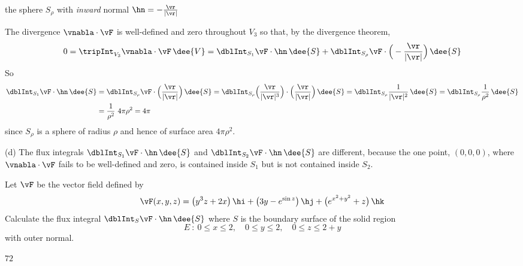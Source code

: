 \begin{solution}
\begin{itemize}
the sphere $S_\rho$ with \emph{inward} normal $\hn=-\frac{\vr}{|\vr|}$
\end{itemize}
The divergence $\vnabla\cdot\vF$ is well-defined and zero throughout $V_3$ 
so that, by the divergence theorem,
\begin{align*}
0=\tripInt_{V_3} \vnabla\cdot\vF\,\dee{V}
=\dblInt_{S_1} \vF\cdot\hn\,\dee{S} 
 +\dblInt_{S_\rho} \vF\cdot\Big(-\frac{\vr}{|\vr|}\Big)\,\dee{S}
\end{align*}
So
\begin{align*}
\dblInt_{S_1} \vF\cdot\hn\,\dee{S}
&=\dblInt_{S_\rho} \vF\cdot\Big(\frac{\vr}{|\vr|}\Big)\,\dee{S}
=\dblInt_{S_\rho} \Big(\frac{\vr}{|\vr|^3}\Big)\cdot\Big(\frac{\vr}{|\vr|}\Big)\,\dee{S}
=\dblInt_{S_\rho} \frac{1}{|\vr|^2}\,\dee{S}
=\dblInt_{S_\rho} \frac{1}{\rho^2}\,\dee{S} \\
&=\frac{1}{\rho^2}\ 4\pi\rho^2=4\pi
\end{align*}
since $S_\rho$ is a sphere of radius $\rho$ and hence of surface area $4\pi\rho^2$.

(d) The flux integrals $\dblInt_{S_1} \vF\cdot\hn\,\dee{S}$ and
$\dblInt_{S_2} \vF\cdot\hn\,\dee{S}$ are different, because the one point,
$(0,0,0)$, where $\vnabla\cdot\vF$ fails to be well-defined and zero,
is contained inside $S_1$ but is not contained inside $S_2$.
\end{solution}

\begin{question}[M317 2016D] %
Let $\vF$ be the vector field defined by
\begin{equation*}
\vF(x,y, z) = \big(y^3 z + 2x\big)\,\hi 
             +\big(3y - e^{\sin z}\big)\,\hj + \big(e^{x^2+y^2}+ z\big)\,\hk
\end{equation*}
Calculate the flux integral $\dblInt_S \vF\cdot\hn\,\dee{S}$
where $S$ is the boundary surface of the solid region
\begin{equation*}
E\ :\ 
0 \le x \le 2,\quad
0 \le y \le 2,\quad
0 \le z \le 2+ y
\end{equation*}
with outer normal.
\end{question}

%

\begin{answer} 
$72$
\end{answer}

